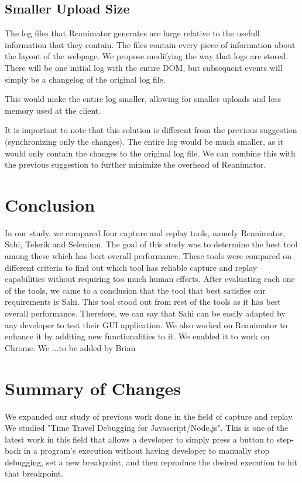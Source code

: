 \documentclass[12pt,journal]{IEEEtran}
\begin{document}
\subsection{Smaller Upload Size}
The log files that Reanimator generates are large relative to the usefull information that they contain. The files contain every piece of information about the layout of the webpage. We propose modifying the way that logs are stored. There will be one initial log with the entire DOM, but subsequent events will simply be a changelog of the original log file.
\par
This would make the entire log smaller, allowing for smaller uploads and less memory used at the client.
\par
It is important to note that this solution is different from the previous suggestion (synchronizing only the changes). The entire log would be much smaller, as it would only contain the changes to the original log file. We can combine this with the previous suggestion to further minimize the overhead of Reanimator.

\section{Conclusion}
In our study, we compared four capture and replay tools, namely Reanimator, Sahi, Telerik and Selenium. The goal of this study was to determine the best tool among these which has best overall performance. These tools were compared on different criteria to find out which tool has reliable capture and replay capabilities without requiring too much human efforts. After evaluating each one of the tools, we came to a conclusion that the tool that best satisfies our requirements is Sahi. This tool stood out from rest of the tools as it has best overall performance. Therefore, we can say that Sahi can be easily adapted by any developer to test their GUI application. We also worked on Reanimator to enhance it by additing new functionalities to it. We enabled it to work on Chrome. We ...{to be added by Brian}
 
\section{Summary of Changes}
We expanded our study of previous work done in the field of capture and replay. We studied "Time Travel Debugging for Javascript/Node.js". This is one of the latest work in this field that allows a developer to simply press a button to step-back in a program’s execution without having developer to manually stop debugging, set a new breakpoint, and then reproduce the desired execution to hit that breakpoint.




\printbibliography
\end{document}
